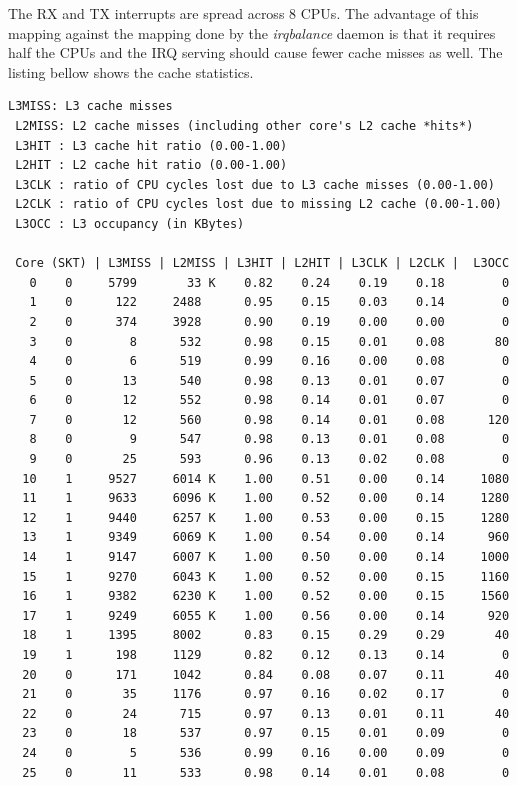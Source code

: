 \noindent
The RX and TX interrupts are spread across 8 CPUs.
The advantage of this mapping against the mapping done by the {\it{irqbalance}} daemon
is that it requires half the CPUs and the IRQ serving should cause fewer cache misses as well.
The listing bellow shows the cache statistics.
\begin{lstlisting}[language=TeX]
 L3MISS: L3 cache misses 
 L2MISS: L2 cache misses (including other core's L2 cache *hits*) 
 L3HIT : L3 cache hit ratio (0.00-1.00)
 L2HIT : L2 cache hit ratio (0.00-1.00)
 L3CLK : ratio of CPU cycles lost due to L3 cache misses (0.00-1.00)
 L2CLK : ratio of CPU cycles lost due to missing L2 cache (0.00-1.00)
 L3OCC : L3 occupancy (in KBytes)
 
 Core (SKT) | L3MISS | L2MISS | L3HIT | L2HIT | L3CLK | L2CLK |  L3OCC
   0    0     5799       33 K    0.82    0.24    0.19    0.18        0
   1    0      122     2488      0.95    0.15    0.03    0.14        0
   2    0      374     3928      0.90    0.19    0.00    0.00        0
   3    0        8      532      0.98    0.15    0.01    0.08       80
   4    0        6      519      0.99    0.16    0.00    0.08        0
   5    0       13      540      0.98    0.13    0.01    0.07        0
   6    0       12      552      0.98    0.14    0.01    0.07        0
   7    0       12      560      0.98    0.14    0.01    0.08      120
   8    0        9      547      0.98    0.13    0.01    0.08        0
   9    0       25      593      0.96    0.13    0.02    0.08        0
  10    1     9527     6014 K    1.00    0.51    0.00    0.14     1080
  11    1     9633     6096 K    1.00    0.52    0.00    0.14     1280
  12    1     9440     6257 K    1.00    0.53    0.00    0.15     1280
  13    1     9349     6069 K    1.00    0.54    0.00    0.14      960
  14    1     9147     6007 K    1.00    0.50    0.00    0.14     1000
  15    1     9270     6043 K    1.00    0.52    0.00    0.15     1160
  16    1     9382     6230 K    1.00    0.52    0.00    0.15     1560
  17    1     9249     6055 K    1.00    0.56    0.00    0.14      920
  18    1     1395     8002      0.83    0.15    0.29    0.29       40
  19    1      198     1129      0.82    0.12    0.13    0.14        0
  20    0      171     1042      0.84    0.08    0.07    0.11       40
  21    0       35     1176      0.97    0.16    0.02    0.17        0
  22    0       24      715      0.97    0.13    0.01    0.11       40
  23    0       18      537      0.97    0.15    0.01    0.09        0
  24    0        5      536      0.99    0.16    0.00    0.09        0
  25    0       11      533      0.98    0.14    0.01    0.08        0

\end{lstlisting}
